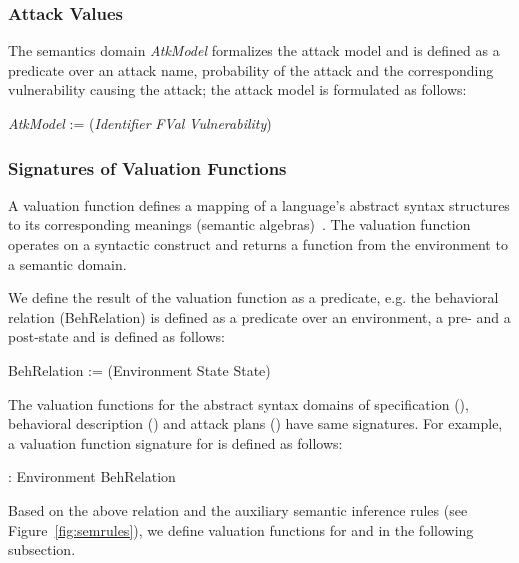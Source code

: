 \documentclass[conference]{IEEEtran}
\begin{document}
\subsubsection*{Attack Values}
The semantics domain \emph{AtkModel} formalizes the attack model and is defined as a predicate over an attack name, probability of the attack and the corresponding vulnerability causing the attack; the attack model is formulated as follows:
\begin{center}
\emph{AtkModel} := (\emph{Identifier}  \emph{FVal}  \emph{Vulnerability})
\end{center}


\subsubsection{Signatures of Valuation Functions}
A valuation function defines a mapping of a language's abstract syntax structures to its corresponding meanings (semantic algebras)~\cite{Schmidt86}. The valuation function operates on a syntactic construct and returns a function from the environment to a semantic domain.



We define the result of the valuation function as a predicate, e.g. the behavioral relation (BehRelation) is defined as a predicate over an environment, a pre- and a post-state and is defined as follows:
\begin{center}
BehRelation := (Environment  State  State)
\end{center}

The valuation functions for the abstract syntax domains of specification (), behavioral description () and attack plans () have same signatures. For example, a valuation function signature for  is defined as follows:
\begin{center}
\textlbrackdbl \textrbrackdbl : Environment  BehRelation
\end{center}

\enlargethispage*{1cm}
Based on the above relation and the auxiliary semantic inference rules (see Figure~\ref{fig:semrules}), we define valuation functions for  and  in the following subsection.
\end{document}
